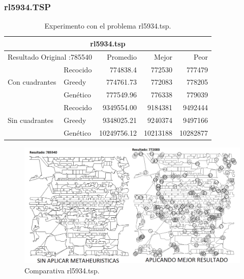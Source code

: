 \subsubsection{rl5934.TSP}
\begin{table}[hbtp]
 \centering 
    \caption{Experimento con el problema rl5934.tsp.} 
	\begin{tabular}{ | l   l | r | r | r |   }
         \hline\multicolumn{5}{|c|}{ \rowcolor[gray]{0.8}rl5934.tsp} \\\hline
         \multicolumn{2}{|l|}{Resultado Original :785540}  & Promedio & Mejor & Peor \\ \hline
                & Recocido  & 774838.4 & 772530 & \cellcolor[gray]{0.9} 777479  \\ 
 Con cuadrantes & Greedy    & \cellcolor[gray]{0.9} 774761.73 & \cellcolor[gray]{0.9} 772083 & 778205  \\ 
                & Genético  & 777549.96 & 776338 & 779039  \\ 
                \hline
                & Recocido  & 9349554.00 & \cellcolor[gray]{0.9} 9184381 & \cellcolor[gray]{0.9} 9492444   \\ 
 Sin cuadrantes & Greedy    & \cellcolor[gray]{0.9} 9348025.21 & 9240374 & 9497166   \\ 
                & Genético  & 10249756.12 & 10213188 & 10282877   \\ 
                \hline
    \end{tabular}
    \label{table:EXP_rl5934.tsp}
\end{table}
\begin{figure}[hbtp]
    \centering
        \includegraphics[width=1\textwidth]{PruebasResultados/Experimentos_Comparativas/rl5934.png}
        \caption{Comparativa rl5934.tsp.}
        \label{fig:rl5934_comparativa.png}
\end{figure}
